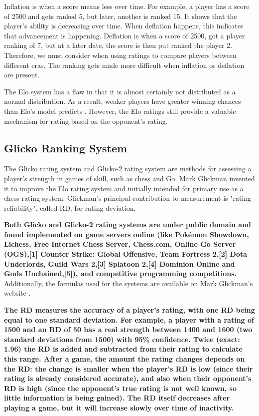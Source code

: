 		
		Inflation is when a score means less over time. For example, a player has a score of 2500 and gets ranked 5, but later, another is ranked 15. It shows that the player's ability is decreasing over time. When deflation happens, this indicates that advancement is happening. Deflation is when a score of 2500, got a player ranking of 7, but at a later date, the score is then put ranked the player 2. Therefore, we must consider when using ratings to compare players between different eras. The ranking gets made more difficult when inflation or deflation are present. %
		
		The Elo system has a flaw in that it is almost certainly not distributed as a normal distribution. As a result, weaker players have greater winning chances than Elo's model predicts \cite{weng2011bayesian}. However, the Elo ratings still provide a valuable mechanism for rating based on the opponent's rating.
	
	\subsection{Glicko Ranking System}
		The Glicko rating system \cite{glickman1995glicko} and Glicko-2 rating system \cite{glickman2012example} are methods for assessing a player's strength in games of skill, such as chess and Go. Mark Glickman invented it to improve the Elo rating system and initially intended for primary use as a chess rating system. Glickman's principal contribution to measurement is "rating reliability", called RD, for rating deviation.
	
		\textbf{Both Glicko and Glicko-2 rating systems are under public domain and found implemented on game servers online (like Pokémon Showdown, Lichess, Free Internet Chess Server, Chess.com, Online Go Server (OGS),[1] Counter Strike: Global Offensive, Team Fortress 2,[2] Dota Underlords, Guild Wars 2,[3] Splatoon 2,[4] Dominion Online and Gods Unchained,[5]), and competitive programming competitions.} Additionally, the formulas used for the systems are available on Mark Glickman's website \cite{glickman_website}.
	
		\textbf{The RD measures the accuracy of a player's rating, with one RD being equal to one standard deviation. For example, a player with a rating of 1500 and an RD of 50 has a real strength between 1400 and 1600 (two standard deviations from 1500) with 95\% confidence. Twice (exact: 1.96) the RD is added and subtracted from their rating to calculate this range. After a game, the amount the rating changes depends on the RD: the change is smaller when the player's RD is low (since their rating is already considered accurate), and also when their opponent's RD is high (since the opponent's true rating is not well known, so little information is being gained). The RD itself decreases after playing a game, but it will increase slowly over time of inactivity.}
	

